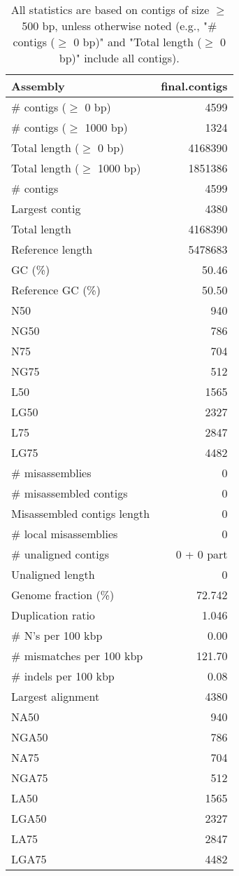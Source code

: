 \documentclass[12pt,a4paper]{article}
\begin{document}
\begin{table}[ht]
\begin{center}
\caption{All statistics are based on contigs of size $\geq$ 500 bp, unless otherwise noted (e.g., "\# contigs ($\geq$ 0 bp)" and "Total length ($\geq$ 0 bp)" include all contigs).}
\begin{tabular}{|l*{1}{|r}|}
\hline
Assembly & final.contigs \\ \hline
\# contigs ($\geq$ 0 bp) & 4599 \\ \hline
\# contigs ($\geq$ 1000 bp) & 1324 \\ \hline
Total length ($\geq$ 0 bp) & 4168390 \\ \hline
Total length ($\geq$ 1000 bp) & 1851386 \\ \hline
\# contigs & 4599 \\ \hline
Largest contig & 4380 \\ \hline
Total length & 4168390 \\ \hline
Reference length & 5478683 \\ \hline
GC (\%) & 50.46 \\ \hline
Reference GC (\%) & 50.50 \\ \hline
N50 & 940 \\ \hline
NG50 & 786 \\ \hline
N75 & 704 \\ \hline
NG75 & 512 \\ \hline
L50 & 1565 \\ \hline
LG50 & 2327 \\ \hline
L75 & 2847 \\ \hline
LG75 & 4482 \\ \hline
\# misassemblies & 0 \\ \hline
\# misassembled contigs & 0 \\ \hline
Misassembled contigs length & 0 \\ \hline
\# local misassemblies & 0 \\ \hline
\# unaligned contigs & 0 + 0 part \\ \hline
Unaligned length & 0 \\ \hline
Genome fraction (\%) & 72.742 \\ \hline
Duplication ratio & 1.046 \\ \hline
\# N's per 100 kbp & 0.00 \\ \hline
\# mismatches per 100 kbp & 121.70 \\ \hline
\# indels per 100 kbp & 0.08 \\ \hline
Largest alignment & 4380 \\ \hline
NA50 & 940 \\ \hline
NGA50 & 786 \\ \hline
NA75 & 704 \\ \hline
NGA75 & 512 \\ \hline
LA50 & 1565 \\ \hline
LGA50 & 2327 \\ \hline
LA75 & 2847 \\ \hline
LGA75 & 4482 \\ \hline
\end{tabular}
\end{center}
\end{table}
\end{document}
